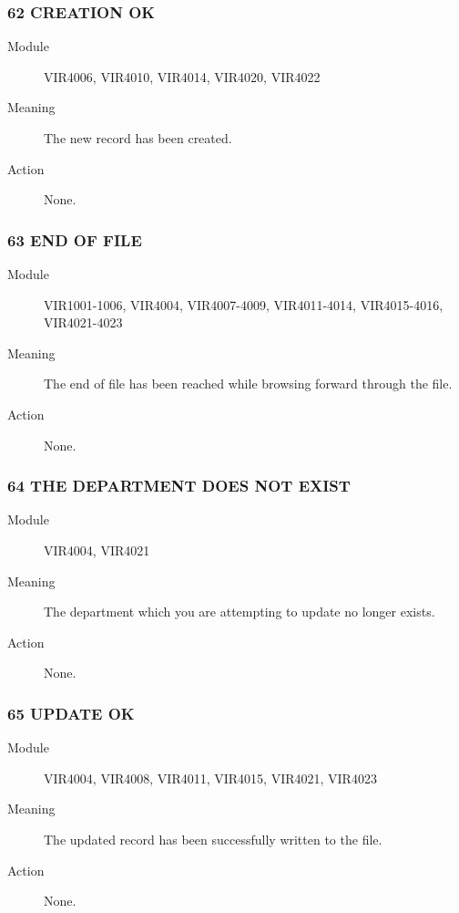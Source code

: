 \documentclass[letterpaper,10pt,english]{sphinxmanual}
\begin{document}
\subsubsection{62 CREATION OK}
\label{\detokenize{messages:id1}}\begin{description}
\item[{Module}] \leavevmode
VIR4006, VIR4010, VIR4014, VIR4020, VIR4022

\item[{Meaning}] \leavevmode
The new record has been created.

\item[{Action}] \leavevmode
None.

\end{description}


\subsubsection{63 END OF FILE}
\label{\detokenize{messages:end-of-file}}\begin{description}
\item[{Module}] \leavevmode
VIR1001-1006, VIR4004, VIR4007-4009, VIR4011-4014, VIR4015-4016, VIR4021-4023

\item[{Meaning}] \leavevmode
The end of file has been reached while browsing forward through the file.

\item[{Action}] \leavevmode
None.

\end{description}


\subsubsection{64 THE DEPARTMENT DOES NOT EXIST}
\label{\detokenize{messages:the-department-does-not-exist}}\begin{description}
\item[{Module}] \leavevmode
VIR4004, VIR4021

\item[{Meaning}] \leavevmode
The department which you are attempting to update no longer exists.

\item[{Action}] \leavevmode
None.

\end{description}


\subsubsection{65 UPDATE OK}
\label{\detokenize{messages:id2}}\begin{description}
\item[{Module}] \leavevmode
VIR4004, VIR4008, VIR4011, VIR4015, VIR4021, VIR4023

\item[{Meaning}] \leavevmode
The updated record has been successfully written to the file.

\item[{Action}] \leavevmode
None.

\end{description}
\end{document}
